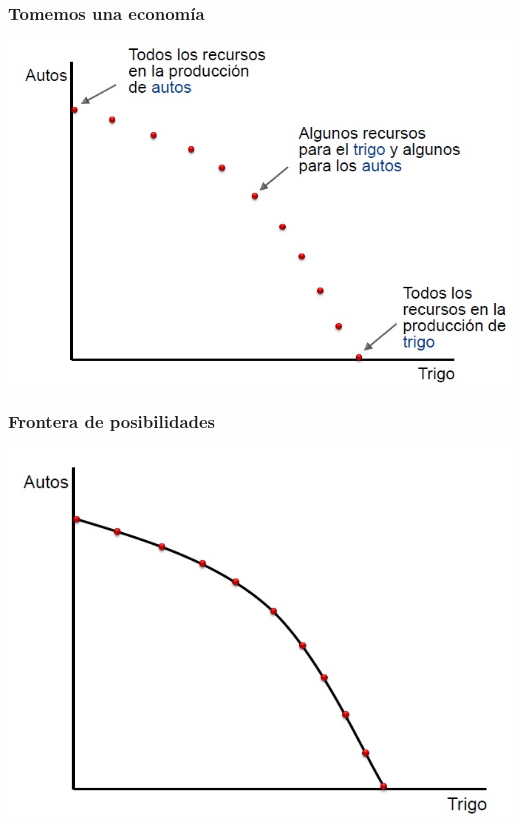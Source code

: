 \documentclass{beamer}
\begin{document}
\begin{frame}
\frametitle{Tomemos una economía}
\begin{center}
    \includegraphics[scale=0.6]{Tema_11.2_tomemosunaeconomia.jpg}
\end{center}
\end{frame}

\begin{frame}
\frametitle{Frontera de posibilidades}
\begin{center}
    \includegraphics[scale=0.6]{Tema_11.3_frontera.jpg}
\end{center}
\end{frame}
\end{document}
